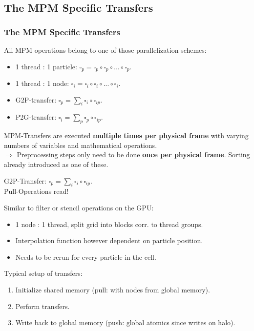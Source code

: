 \documentclass{beamer}
\begin{document}
\subsection{The MPM Specific Transfers}
\begin{frame}
\frametitle{The MPM Specific Transfers}
All MPM operations belong to one of those parallelization schemes:
\begin{itemize}
 \item 1 thread : 1 particle: $\square_p = \square_p \circ \square_p \circ ... \circ \square_p$.
 \item 1 thread : 1 node: $\square_i = \square_i \circ \square_i \circ ... \circ \square_i$.
 \item G2P-transfer: $\square_p = \sum_i \square_i \circ \square_{ip}.$
 \item P2G-transfer: $\square_i = \sum_p \square_p \circ \square_{ip}.$
\end{itemize}
\vfill
MPM-Transfers are executed \textbf{multiple times per physical frame} with varying numbers of variables and mathematical operations.\\\vspace{5}
$\Rightarrow$ Preprocessing steps only need to be done \textbf{once per physical frame}. Sorting already introduced as one of these.
\end{frame}
\begin{frame}
\begin{minipage}{\textwidth}
  G2P-Transfer: $\square_p = \sum_i \square_i \circ \square_{ip}.$\\
  
  Pull-Operations read!
\end{minipage}
\end{frame}
\begin{frame}
Similar to filter or stencil operations on the GPU:
\begin{itemize}
  \item 1 node : 1 thread, split grid into blocks corr. to thread groups.
  \item Interpolation function however dependent on particle position.
  \item Needs to be rerun for every particle in the cell.
\end{itemize}
\vfill
Typical setup of transfers:
\begin{enumerate}
  \item Initialize shared memory (pull: with nodes from global memory).
  \item Perform transfers.
  \item Write back to global memory (push: global atomics since writes on halo).
\end{enumerate}
\end{frame}
\end{document}
